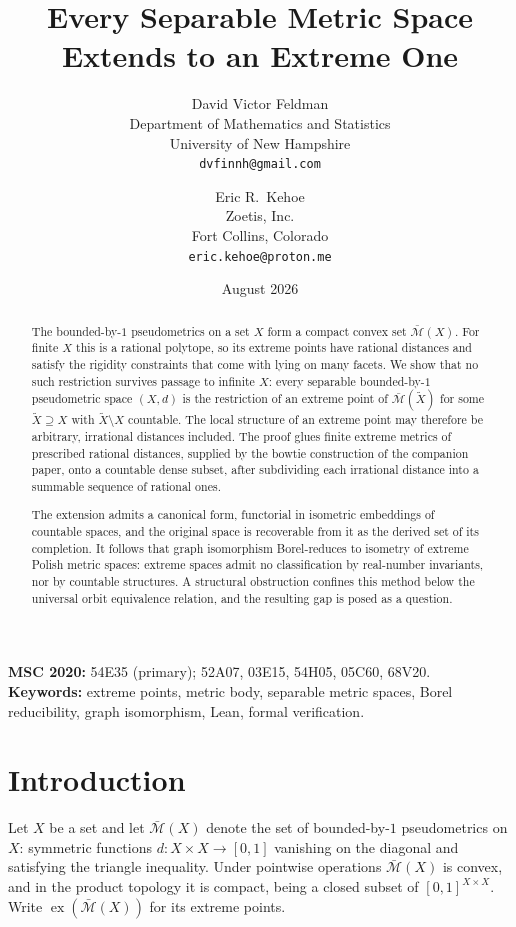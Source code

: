 \documentclass[11pt]{article}
\title{\textbf{Every Separable Metric Space Extends to an Extreme One}}
\author{David Victor Feldman\\
\small Department of Mathematics and Statistics\\
\small University of New Hampshire\\
\small \texttt{dvfinnh@gmail.com}
\and
Eric R.\ Kehoe\\
\small Zoetis, Inc.\\
\small Fort Collins, Colorado\\
\small \texttt{eric.kehoe@proton.me}}
\date{August 2026}
\theoremstyle{definition}
\theoremstyle{remark}
\newcommand{\bM}{\bar{\mathcal{M}}}
\newcommand{\ex}{\operatorname{ex}}
\begin{document}
\maketitle

\begin{abstract}
The bounded-by-$1$ pseudometrics on a set $X$ form a compact convex set $\bM(X)$. For
finite $X$ this is a rational polytope, so its extreme points have rational distances and
satisfy the rigidity constraints that come with lying on many facets. We show that no such
restriction survives passage to infinite $X$: every separable bounded-by-$1$ pseudometric
space $(X,d)$ is the restriction of an extreme point of $\bM(\tilde X)$ for some
$\tilde X \supseteq X$ with $\tilde X \setminus X$ countable. The local structure of an
extreme point may therefore be arbitrary, irrational distances included. The proof glues
finite extreme metrics of prescribed rational distances, supplied by the bowtie
construction of the companion paper, onto a countable dense subset, after subdividing each
irrational distance into a summable sequence of rational ones.

The extension admits a canonical form, functorial in isometric embeddings of countable
spaces, and the original space is recoverable from it as the derived set of its completion.
It follows that graph isomorphism Borel-reduces to isometry of extreme Polish metric
spaces: extreme spaces admit no classification by real-number invariants, nor by countable
structures. A structural obstruction confines this method below the universal orbit
equivalence relation, and the resulting gap is posed as a question.
\end{abstract}

\medskip
\noindent\textbf{MSC 2020:} 54E35 (primary); 52A07, 03E15, 54H05, 05C60, 68V20.\\
\textbf{Keywords:} extreme points, metric body, separable metric spaces, Borel
reducibility, graph isomorphism, Lean, formal verification.

\section{Introduction}
\label{sec:intro}

Let $X$ be a set and let $\bM(X)$ denote the set of bounded-by-$1$ pseudometrics on $X$:
symmetric functions $d\colon X\times X\to[0,1]$ vanishing on the diagonal and satisfying
the triangle inequality. Under pointwise operations $\bM(X)$ is convex, and in the product
topology it is compact, being a closed subset of $[0,1]^{X\times X}$. Write $\ex(\bM(X))$
for its extreme points.
\end{document}
